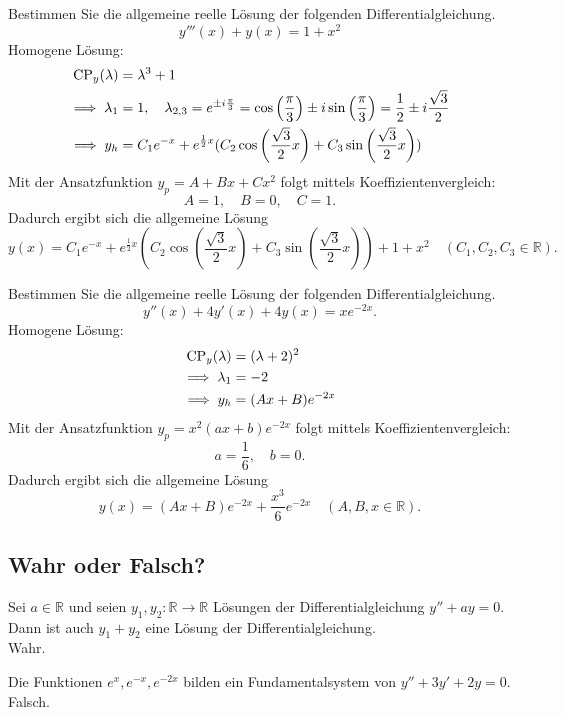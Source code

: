 \documentclass[parskip=full]{scrartcl}
\begin{document}
Bestimmen Sie die allgemeine reelle Lösung der folgenden Differentialgleichung.
\begin{displaymath}
  y'''(x) + y(x) = 1 + x^2
\end{displaymath}
Homogene Lösung:
\begin{align*}
  \operatorname{CP}_y(\lambda) &= \lambda^3 + 1\\
  \implies \lambda_1 &= 1, \quad \lambda_{2,3} = e^{\pm i \frac{\pi}{3}} = \cos\left(\frac{\pi}{3}\right) \pm i \sin\left(\frac{\pi}{3}\right) = \frac{1}{2} \pm i \frac{\sqrt{3}}{2}\\
  \implies y_h &= C_1 e^{-x} + e^{\frac{1}{2} x} (C_2 \cos\left(\frac{\sqrt{3}}{2}x\right) + C_3 \sin\left(\frac{\sqrt{3}}{2}x\right))
\end{align*}
Mit der Ansatzfunktion $y_p = A + Bx + Cx^2$ folgt mittels Koeffizientenvergleich:
\begin{displaymath}
  A = 1, \quad B = 0, \quad C = 1.
\end{displaymath}
Dadurch ergibt sich die allgemeine Lösung
\begin{displaymath}
  y(x) = C_1 e^{-x} + e^{\frac{1}{2} x} (C_2 \cos\left(\frac{\sqrt{3}}{2}x\right) + C_3 \sin\left(\frac{\sqrt{3}}{2}x\right)) + 1 + x^2 \quad (C_1, C_2, C_3 \in \mathbb{R}).
\end{displaymath}

Bestimmen Sie die allgemeine reelle Lösung der folgenden Differentialgleichung.
\begin{displaymath}
  y''(x) + 4y'(x) + 4y(x) = xe^{-2x}.
\end{displaymath}
Homogene Lösung:
\begin{align*}
  \operatorname{CP}_y(\lambda) &= (\lambda + 2)^2\\
  \implies \lambda_1 &= -2\\
  \implies y_h &= (Ax + B)e^{-2x}
\end{align*}
Mit der Ansatzfunktion $y_p = x^2(ax + b)e^{-2x}$ folgt mittels Koeffizientenvergleich:
\begin{displaymath}
  a = \frac{1}{6}, \quad b = 0.
\end{displaymath}
Dadurch ergibt sich die allgemeine Lösung
\begin{displaymath}
  y(x) = (Ax + B) e^{-2x} + \frac{x^3}{6}e^{-2x} \quad (A,B,x \in \mathbb{R}).
\end{displaymath}

\subsection{Wahr oder Falsch?}
Sei $a \in \mathbb{R}$ und seien $y_1, y_2 : \mathbb{R} \to \mathbb{R}$ Lösungen der Differentialgleichung $y'' + ay = 0$.
Dann ist auch $y_1 + y_2$ eine Lösung der Differentialgleichung.\\
Wahr.

Die Funktionen $e^x, e^{-x}, e^{-2x}$ bilden ein Fundamentalsystem von $y'' + 3y' + 2y = 0$.\\
Falsch.

\end{document}
